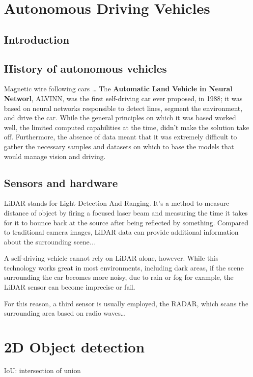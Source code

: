 \newpage
\section{Autonomous Driving Vehicles}
\subsection{Introduction}

\cite{DBLP:journals/ftcgv/JanaiGBG20}


\subsection{History of autonomous vehicles}
Magnetic wire following cars \dots
The \textbf{Automatic Land Vehicle in Neural Networl}, ALVINN, was the first self-driving car ever proposed, in 1988; it was based on neural networks responsible to detect lines, segment the environment, and drive the car.
While the general principles on which it was based worked well, the limited computed capabilities at the time, didn't make the solution take off. Furthermore, the absence of data meant that it was extremely difficult to gather the necessary samples and datasets on which to base the models that would manage vision and driving.


\subsection{Sensors and hardware}
LiDAR stands for Light Detection And Ranging. It's a method to measure distance of object by firing a focused laser beam and measuring the time it takes for it to bounce back at the source after being reflected by something.
Compared to traditional camera images, LiDAR data can provide additional information about the surrounding scene...

A self-driving vehicle cannot rely on LiDAR alone, however. While this technology works great in most environments, including dark areas, if the scene surrounding the car becomes more noisy, due to rain or fog for example, the LiDAR sensor can become imprecise or fail.

For this reason, a third sensor is usually employed, the RADAR, which scans the surrounding area based on radio waves\dots





\section{2D Object detection}
IoU: intersection of union





